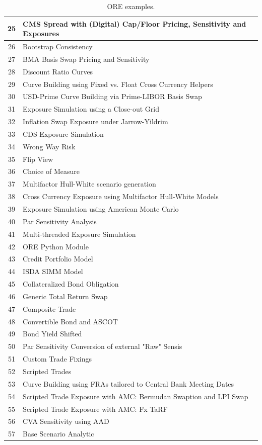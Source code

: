 \documentclass[12pt, a4paper]{article}
\begin{document}
\begin{table}[hbt]
\begin{center}
\begin{tabular}{|c|l|}
\hline
25 & CMS Spread with (Digital) Cap/Floor Pricing, Sensitivity and Exposures\\
\hline
26 & Bootstrap Consistency\\
\hline
27 & BMA Basis Swap Pricing and Sensitivity\\
\hline
28 & Discount Ratio Curves\\
\hline
29 & Curve Building using Fixed vs. Float Cross Currency Helpers\\
\hline
30 & USD-Prime Curve Building via Prime-LIBOR Basis Swap\\
\hline
31 & Exposure Simulation using a Close-out Grid\\
\hline
32 & Inflation Swap Exposure under Jarrow-Yildrim\\ 
\hline
33 & CDS Exposure Simulation \\
\hline
34 & Wrong Way Risk \\
\hline
35 & Flip View \\
\hline
36 & Choice of Measure \\
\hline
37 & Multifactor Hull-White scenario generation \\
\hline
38 & Cross Currency Exposure using Multifactor Hull-White Models \\
\hline
39 & Exposure Simulation using American Monte Carlo \\
\hline
40 & Par Sensitivity Analysis \\
\hline
41 & Multi-threaded Exposure Simulation \\
\hline
42 & ORE Python Module \\
\hline
43 & Credit Portfolio Model \\
\hline
44 & ISDA SIMM Model \\
\hline
45 & Collateralized Bond Obligation \\
\hline
46 & Generic Total Return Swap \\
\hline
47 & Composite Trade \\
\hline
48 & Convertible Bond and ASCOT \\
\hline
49 & Bond Yield Shifted \\
\hline
50 & Par Sensitivity Conversion of external "Raw" Sensis \\
\hline
51 & Custom Trade Fixings\\
\hline
52 & Scripted Trades \\
\hline
53 & Curve Building using FRAs tailored to Central Bank Meeting Dates\\
\hline
54 & Scripted Trade Exposure with AMC: Bermudan Swaption and LPI Swap \\
\hline
55 & Scripted Trade Exposure with AMC: Fx TaRF \\
\hline
56 & CVA Sensitivity using AAD \\
\hline
57 & Base Scenario Analytic \\
\hline
\end{tabular}
\caption{ORE examples.}
\label{tab_0}
\end{center}
\end{table}
\clearpage
\end{document}

